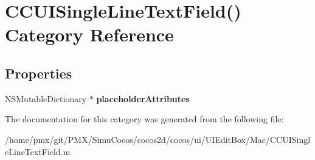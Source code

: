 \hypertarget{categoryCCUISingleLineTextField_07_08}{}\section{C\+C\+U\+I\+Single\+Line\+Text\+Field() Category Reference}
\label{categoryCCUISingleLineTextField_07_08}
\subsection*{Properties}
\begin{DoxyCompactItemize}
\item 
\mbox{\label{categoryCCUISingleLineTextField_07_08_a7e2eda213d83c0506fc8aeadbd3e3b10}} 
N\+S\+Mutable\+Dictionary $\ast$ {\bfseries placeholder\+Attributes}
\end{DoxyCompactItemize}


The documentation for this category was generated from the following file\+:\begin{DoxyCompactItemize}
\item 
/home/pmx/git/\+P\+M\+X/\+Simu\+Cocos/cocos2d/cocos/ui/\+U\+I\+Edit\+Box/\+Mac/C\+C\+U\+I\+Single\+Line\+Text\+Field.\+m\end{DoxyCompactItemize}
